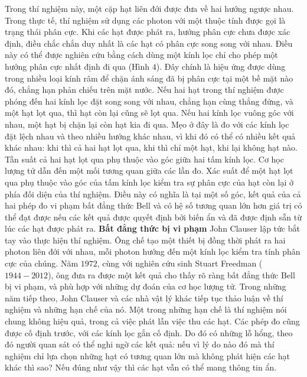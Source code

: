 \begin{multicols}{2}
	\vskip 0.1cm
	Trong thí nghiệm này, một cặp hạt liên đới được đưa về hai hướng ngược nhau. Trong thực tế, thí nghiệm sử dụng các photon với một thuộc tính được gọi là trạng thái phân cực. Khi các hạt được phát ra, hướng phân cực chưa được xác định, điều chắc chắn duy nhất là các hạt có phân cực song song với nhau. Điều này có thể được nghiên cứu bằng cách dùng một kính lọc chỉ cho phép một hướng phân cực nhất định đi qua (Hình $4$). Đây chính là hiệu ứng được dùng trong nhiều loại kính râm để chặn ánh sáng đã bị phân cực tại một bề mặt nào đó, chẳng hạn phản chiếu trên mặt nước.
	\vskip 0.1cm
	Nếu hai hạt trong thí nghiệm được phóng đến hai kính lọc đặt song song với nhau, chẳng hạn cùng thẳng đứng, và một hạt lọt qua, thì hạt còn lại cũng sẽ lọt qua. Nếu hai kính lọc vuông góc với nhau, một hạt bị chặn lại còn hạt kia đi qua. Mẹo ở đây là đo với các kính lọc đặt lệch nhau và theo nhiều hướng khác nhau, vì khi đó có thể có nhiều kết quả khác nhau: khi thì cả hai hạt lọt qua, khi thì chỉ một hạt, khi lại không hạt nào. Tần suất cả hai hạt lọt qua phụ thuộc vào góc giữa hai tấm kính lọc.
	\vskip 0.1cm
	Cơ học lượng tử dẫn đến một mối tương quan giữa các lần đo. Xác suất để một hạt lọt qua phụ thuộc vào góc của tấm kính lọc kiểm tra sự phân cực của hạt còn lại ở phía đối diện của thí nghiệm. Điều này có nghĩa là tại một số góc, kết quả của cả hai phép đo vi phạm bất đẳng thức Bell và có hệ số tương quan lớn hơn giá trị có thể đạt được nếu các kết quả được quyết định bởi biến ẩn và đã được định sẵn từ lúc các hạt được phát ra.
	\vskip 0.1cm
	\textbf{\color{timhieukhoahoc}Bất đẳng thức bị vi phạm}
	\vskip 0.1cm
	John Clauser lập tức bắt tay vào thực hiện thí nghiệm. Ông chế tạo một thiết bị đồng thời phát ra hai photon liên đới với nhau, mỗi photon hướng đến một kính lọc kiểm tra tính phân cực của chúng. Năm $1972$, cùng với nghiên cứu sinh Stuart Freedman ($1944 - 2012$), ông đưa ra được một kết quả cho thấy rõ ràng bất đẳng thức Bell bị vi phạm, và phù hợp với những dự đoán của cơ học lượng tử.
	\vskip 0.1cm
	Trong những năm tiếp theo, John Clauser và các nhà vật lý khác tiếp tục thảo luận về thí nghiệm và những hạn chế của nó. Một trong những hạn chế là thí nghiệm nói chung không hiệu quả, trong cả việc phát lẫn việc thu các hạt. Các phép đo cũng được cố định trước, với các kính lọc gắn cố định. Do đó có những lỗ hổng, theo đó người quan sát có thể nghi ngờ các kết quả: nếu vì lý do nào đó mà thí nghiệm chỉ lựa chọn những hạt có tương quan lớn mà không phát hiện các hạt khác thì sao? Nếu đúng như vậy thì các hạt vẫn có thể mang thông tin ẩn.
	\vskip 0.1cm

\end{multicols}
